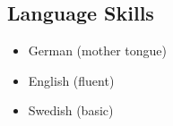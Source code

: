 \documentclass[11pt]{article}
\begin{document}
	\subsection*{Language Skills}
	
	\begin{multicols}{3}
		\begin{itemize}
			\item German (mother tongue)
			\item English (fluent) 
			\item Swedish (basic)
		\end{itemize}
	\end{multicols}
	
	
%	
%		
%		
%		
%		
%		
%		
%		
%		
%		
%		
\end{document}
